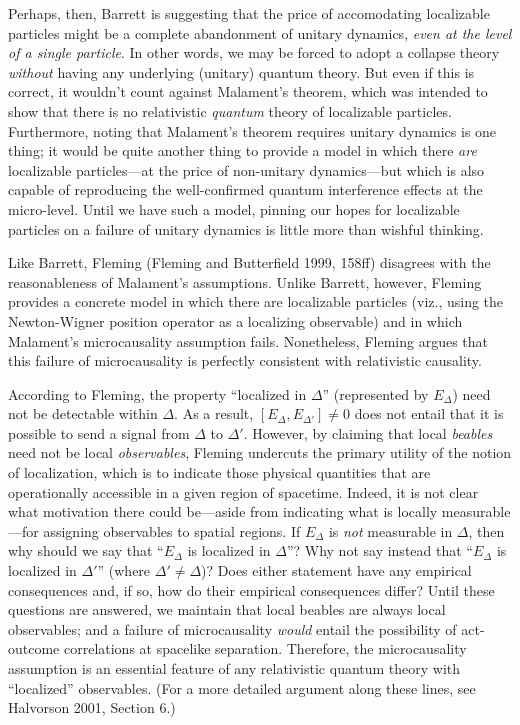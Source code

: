 \documentclass[12pt]{article}
\theoremstyle{remark}
\begin{document}
Perhaps, then, Barrett is suggesting that the price of accomodating
localizable particles might be a complete abandonment of unitary
dynamics, \emph{even at the level of a single particle}.  In other
words, we may be forced to adopt a collapse theory \emph{without}
having any underlying (unitary) quantum theory.  But even if this is
correct, it wouldn't count against Malament's theorem, which was
intended to show that there is no relativistic \emph{quantum} theory
of localizable particles.  Furthermore, noting that Malament's theorem
requires unitary dynamics is one thing; it would be quite another
thing to provide a model in which there \emph{are} localizable
particles---at the price of non-unitary dynamics---but which is also
capable of reproducing the well-confirmed quantum interference effects
at the micro-level.  Until we have such a model, pinning our hopes for
localizable particles on a failure of unitary dynamics is little more
than wishful thinking.

Like Barrett, Fleming (Fleming and Butterfield 1999, 158ff) disagrees
with the reasonableness of Malament's assumptions.  Unlike Barrett,
however, Fleming provides a concrete model in which there are
localizable particles (viz., using the Newton-Wigner position operator
as a localizing observable) and in which Malament's microcausality
assumption fails.  Nonetheless, Fleming argues that this failure of
microcausality is perfectly consistent with relativistic causality.

According to Fleming, the property ``localized in $\Delta$''
(represented by $E_{\Delta}$) need not be detectable within $\Delta$.
As a result, $[E_{\Delta},E_{\Delta '}]\neq 0$ does not entail that it
is possible to send a signal from $\Delta$ to $\Delta '$.  However, by
claiming that local \emph{beables} need not be local
\emph{observables}, Fleming undercuts the primary utility of the
notion of localization, which is to indicate those physical quantities
that are operationally accessible in a given region of spacetime.
Indeed, it is not clear what motivation there could be---aside from
indicating what is locally measurable---for assigning observables to
spatial regions.  If $E_{\Delta}$ is \emph{not} measurable in
$\Delta$, then why should we say that ``$E_{\Delta}$ is localized in
$\Delta$''?  Why not say instead that ``$E_{\Delta}$ is localized in
$\Delta '$'' (where $\Delta '\neq \Delta$)?  Does either statement
have any empirical consequences and, if so, how do their empirical
consequences differ?  Until these questions are answered, we maintain
that local beables are always local observables; and a failure of
microcausality \emph{would} entail the possibility of act-outcome
correlations at spacelike separation.  Therefore, the microcausality
assumption is an essential feature of any relativistic quantum theory
with ``localized'' observables.  (For a more detailed argument along
these lines, see Halvorson 2001, Section 6.)
\end{document}
